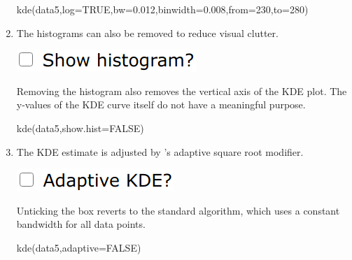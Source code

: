 \begin{refsection}
\begin{enumerate}
\begin{console}
kde(data5,log=TRUE,bw=0.012,binwidth=0.008,from=230,to=280)
\end{console}

\item The histograms can also be removed to reduce visual clutter.

\noindent\begin{minipage}[t]{.2\linewidth}
\strut\vspace*{-\baselineskip}\newline
\includegraphics[width=\linewidth]{../figures/UPbKDEhistogram.png}
\end{minipage}
\begin{minipage}[t]{.8\linewidth}
  Removing the histogram also removes the vertical axis of the KDE
  plot.  The y-values of the KDE curve itself do not have a meaningful
  purpose.
\end{minipage}

\begin{console}
kde(data5,show.hist=FALSE)
\end{console}

\item The KDE estimate is adjusted by \citet{abramson1982}'s adaptive
  square root modifier.

\noindent\begin{minipage}[t]{.19\linewidth}
\strut\vspace*{-\baselineskip}\newline
\includegraphics[width=\linewidth]{../figures/UPbKDEadaptive.png}
\end{minipage}
\begin{minipage}[t]{.81\linewidth}
  Unticking the box reverts to the standard \citet{botev2010}
  algorithm, which uses a constant bandwidth for all data points.
\end{minipage}

\begin{console}
kde(data5,adaptive=FALSE)
\end{console}


\end{enumerate}
\end{refsection}
